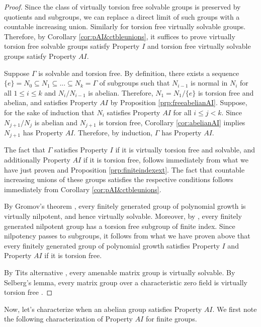 \documentclass[a4paper, 12pt]{amsart}
\theoremstyle{definition}
\theoremstyle{remark}
\numberwithin{equation}{section}
\begin{document}
\begin{proof}
    Since the class of virtually torsion free solvable groups is preserved by quotients and subgroups, we can replace a direct limit of such groups with a countable increasing union. Similarly for torsion free virtually solvable groups. Therefore, by Corollary \ref{cor:pAI&ctbleunions}, it suffices to prove virtually torsion free solvable groups satisfy Property $I$ and torsion free virtually solvable groups satisfy Property $AI$.
    
    Suppose $\Gamma$ is solvable and torsion free. By definition, there exists a sequence $\{e\} = N_{0}\subseteq N_{1}\subseteq ...\subseteq N_{k} = \Gamma$ of subgroups such that $N_{i-1}$ is normal in $N_{i}$ for all $1\leq i\leq k$ and $N_{i}/N_{i-1}$ is abelian. Therefore, $N_{1} = N_{1}/\{e\}$ is torsion free and abelian, and satisfies Property $AI$ by
    Proposition \ref{prp:freeabelianAI}. Suppose, for the sake of induction that $N_{i}$ satisfies Property $AI$ for all $i\leq j < k$. Since $N_{j+1}/N_{j}$ is abelian and $N_{j+1}$ is torsion free, Corollary \ref{cor:abelianAI} implies $N_{j+1}$ has Property $AI$. Therefore, by induction, $\Gamma$ has Property $AI$.

    The fact that $\Gamma$ satisfies Property $I$ if it is virtually torsion free and solvable, and additionally Property $AI$ if it is torsion free, follows immediately from what we have just proven and Proposition \ref{prp:finiteindexext}. The fact that countable increasing unions of these groups satisfies the respective conditions follows immediately from Corollary \ref{cor:pAI&ctbleunions}.

    By Gromov's theorem \cite{G81}, every finitely generated group of polynomial growth is virtually nilpotent, and hence virtually solvable. Moreover, by \cite[Theorem~2.1]{B71}, every finitely generated nilpotent group has a torsion free subgroup of finite index. Since nilpotency passes to subgroups, it follows from what we have proven above that every finitely generated group of polynomial growth satisfies Property $I$ and Property $AI$ if it is torsion free.

    By Tits alternative \cite{T71}, every amenable matrix group is virtually solvable. By Selberg's lemma, every matrix group over a characteristic zero field is virtually torsion free \cite{S60}.
\end{proof}

Now, let's characterize when an abelian group satisfies Property $AI$. We first note the following characterization of Property $AI$ for finite groups.
\end{document}
